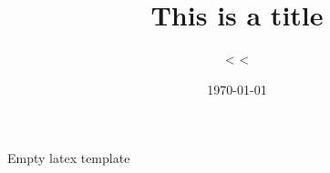 \documentclass[11pt,twoside]{article}
\title{This is a title}
\author{
  <%
  <%
}
\date{\today}
\theoremstyle{plain}
\theoremstyle{definition}
\theoremstyle{remark}
\begin{document}








Empty latex template

\end{document}

